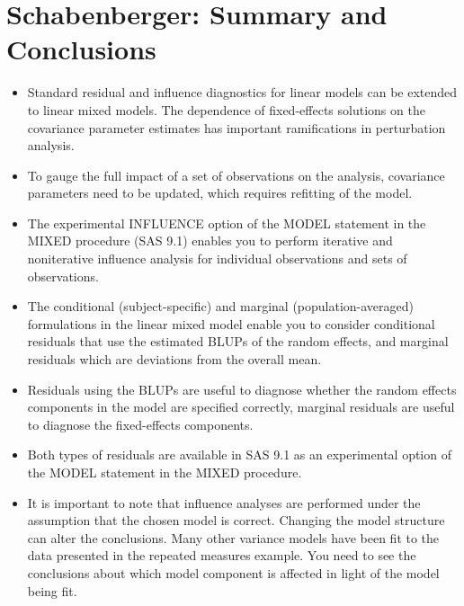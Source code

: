 \documentclass[12pt, a4paper]{report}
\theoremstyle{plain}
\theoremstyle{definition}
\theoremstyle{remark}
\begin{document}
%	
%	



\section{Schabenberger: Summary and Conclusions}
\begin{itemize}
	\item Standard residual and inﬂuence diagnostics for linear models can be extended to linear mixed models. The dependence of ﬁxed-effects solutions on the covariance parameter estimates has important ramiﬁcations in perturbation analysis. 
	\item To gauge the full impact of a set of observations on the analysis, covariance parameters need to be updated, which requires reﬁtting of the model. 
	\item The experimental INFLUENCE option of the MODEL statement in the MIXED procedure (SAS 9.1) enables you to perform iterative and noniterative inﬂuence analysis for individual observations and sets of observations.
	
	\item The conditional (subject-speciﬁc) and marginal (population-averaged) formulations in the linear mixed model enable you to consider conditional residuals that use the estimated BLUPs of the random effects, and marginal residuals which are deviations from the overall mean. 
	\item Residuals using the BLUPs are useful to diagnose whether the random effects components in the model are speciﬁed correctly, marginal residuals are useful to diagnose the ﬁxed-effects components. 
	\item Both types of residuals are available in SAS 9.1 as an experimental option of the MODEL statement in the MIXED procedure.
	
	\item It is important to note that influence analyses are performed under the assumption that the chosen model is correct. Changing the model structure can alter the conclusions. Many other variance models have been ﬁt to the data presented in the repeated measures example. You need to see the conclusions about which model component is affected in light of the model being fit.
\end{itemize}
\end{document}
